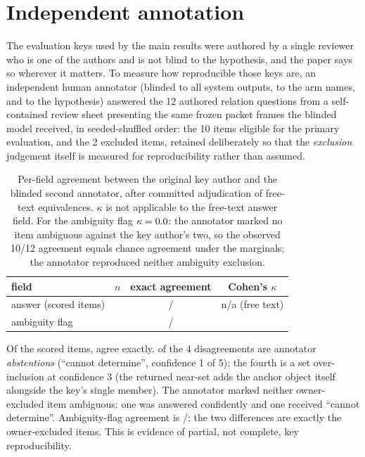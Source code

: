 \section{Independent annotation}
\label{ssec:annotation}

The evaluation keys used by the main results were authored by a single
reviewer who is one of the authors and is not blind to the hypothesis, and
the paper says so wherever it matters. To measure how reproducible those
keys are, an independent human annotator (blinded to all system
outputs, to the arm names, and to the hypothesis) answered the 12 authored
relation questions from a self-contained review sheet presenting the same
frozen packet frames the blinded model received, in seeded-shuffled order:
the 10 items eligible for the primary evaluation, and the 2 excluded items,
retained deliberately so that the \emph{exclusion} judgement itself is
measured for reproducibility rather than assumed.

\begin{table}[t]
  \centering\footnotesize
  \setlength{\tabcolsep}{4pt}
  \begin{tabular}{@{}lccc@{}}
    \toprule
    field & $n$ & exact agreement & Cohen's $\kappa$\\
    \midrule
    answer (scored items) & \SRAnnScoredOf{} &
      \SRAnnScoredAgree{}/\SRAnnScoredOf{} & n/a (free text)\\
    ambiguity flag & \SRAnnAmbiguityOf{} &
      \SRAnnAmbiguityAgree{}/\SRAnnAmbiguityOf{} & \SRAnnAmbiguityKappa{}\\
    \bottomrule
  \end{tabular}
  \caption{Per-field agreement between the original key author and the
  blinded second annotator, after committed adjudication of free-text
  equivalences. $\kappa$ is not applicable to the free-text answer field.
  For the ambiguity flag $\kappa = 0.0{}$: the annotator
  marked no item ambiguous against the key author's two, so the observed
  10/12 agreement equals chance agreement under the marginals; the
  annotator reproduced neither ambiguity exclusion.}
  \label{tab:annotation}
\end{table}

Of the \SRAnnScoredOf{} scored items, \SRAnnScoredAgree{} agree exactly.
\SRAnnAbstainDisagreements{} of the 4 disagreements are annotator
\emph{abstentions} (``cannot determine'', confidence 1 of 5); the fourth is
a set over-inclusion at confidence 3 (the returned near-set adds the anchor
object itself alongside the key's single member). The annotator marked
neither owner-excluded item ambiguous: one was answered confidently and one
received ``cannot determine''. Ambiguity-flag agreement is
\SRAnnAmbiguityAgree{}/\SRAnnAmbiguityOf{}; the two differences are
exactly the owner-excluded items. This is evidence of partial, not
complete, key reproducibility.

